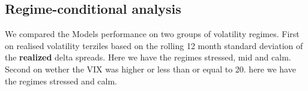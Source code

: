 %
%




\subsection{Regime-conditional analysis}
\label{sec:eval:regime}
We compared the Models performance on two groups of volatility regimes. First on realised volatility terziles based on the rolling 12 month standard deviation of the \textbf{realized} delta spreads. Here we have the regimes stressed, mid and calm. Second on wether the VIX was higher or less than or equal to 20. here we have the regimes stressed and calm. \\

